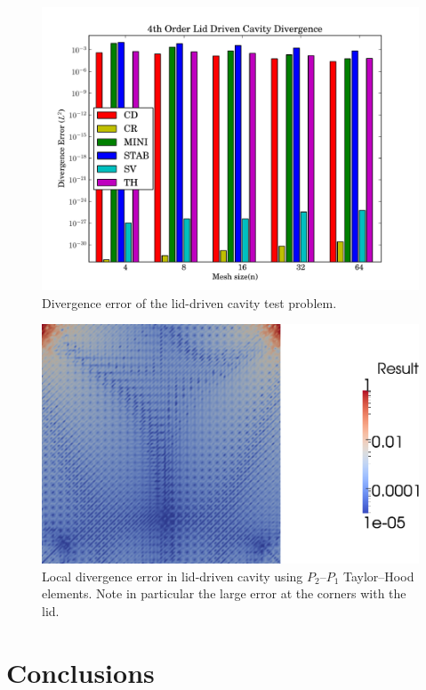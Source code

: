 \begin{figure}
  \center \includegraphics[width=\largefig]{chapters/terrel/pdf/div_4_test.pdf}
  \caption{Divergence error of the lid-driven cavity test problem.}
\label{fig:terrel:4th_Order_lid}
\end{figure}

\begin{figure}
  \center
  \includegraphics[width=\largefig]{chapters/terrel/png/lid_div_error.png}
  \caption{Local divergence error in lid-driven cavity using $P_2$--$P_1$
    Taylor--Hood elements. Note in particular the large error at the corners with
    the lid.}
  \label{fig:terrel:lid_div_error}
\end{figure}

\section{Conclusions}


